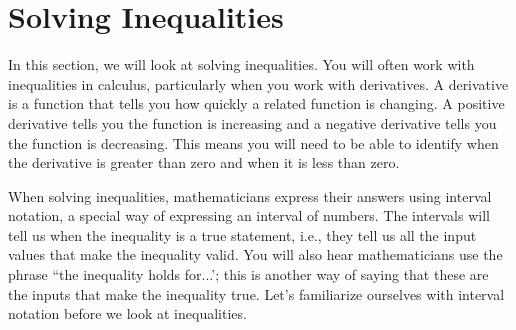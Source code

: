 
\section{Solving Inequalities}\label{sec:inequalities}

In this section, we will look at solving inequalities. You will often work with inequalities in calculus, particularly when you work with derivatives. A derivative is a function that tells you how quickly a related function is changing. A positive derivative tells you the function is increasing and a negative derivative tells you the function is decreasing. This means you will need to be able to identify when the derivative is greater than zero and when it is less than zero.

When solving inequalities, mathematicians express their answers using interval notation, a special way of expressing an interval of numbers. The intervals will tell us when the inequality is a true statement, i.e., they tell us all the input values that make the inequality valid. You will also hear mathematicians use the phrase ``the inequality holds for...'; this is another way of saying that these are the inputs that make the inequality true. Let's familiarize ourselves with interval notation before we look at inequalities.

